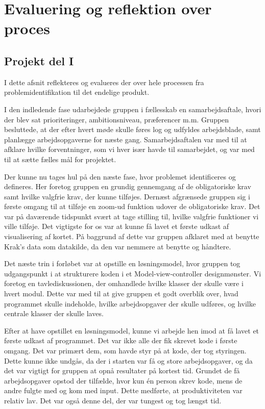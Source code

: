 \section{Evaluering og reflektion over proces}
\label{sec:evaluering_og_reflektion_over_proces}

\subsection{Projekt del I}

I dette afsnit reflekteres og evalueres der over hele processen fra problemidentifikation til det endelige produkt. 

I den indledende fase udarbejdede gruppen i fællesskab en samarbejdsaftale, hvori der blev sat prioriteringer, ambitionsniveau, præferencer m.m. Gruppen besluttede, at der efter hvert møde skulle føres log og udfyldes arbejdsblade, samt planlægge arbejdsopgaverne for næste gang. Samarbejdsaftalen var med til at afklare hvilke forventninger, som vi hver især havde til samarbejdet, og var med til at sætte fælles mål for projektet.

Der kunne nu tages hul på den næste fase, hvor problemet identificeres og defineres. Her foretog gruppen en grundig gennemgang af de obligatoriske krav samt hvilke valgfrie krav, der kunne tilføjes. Dernæst afgrænsede gruppen sig i første omgang til at tilføje en zoom-ud funktion udover de obligatoriske krav. Det var på daværende tidspunkt svært at tage stilling til, hvilke valgfrie funktioner vi ville tilføje. Det vigtigste for os var at kunne få lavet et første udkast af visualisering af kortet. På baggrund af dette var gruppen afklaret med at benytte Krak's data som datakilde, da den var nemmere at benytte og håndtere.   

Det næste trin i forløbet var at opstille en løsningsmodel, hvor gruppen tog udgangspunkt i at strukturere koden i et Model-view-controller designmønster. Vi foretog en tavlediskussionen, der omhandlede hvilke klasser der skulle være i hvert modul. Dette var med til at give gruppen et godt overblik over, hvad programmet skulle indeholde, hvilke arbejdsopgaver der skulle udføres, og hvilke centrale klasser der skulle laves. 

Efter at have opstillet en løsningsmodel, kunne vi arbejde hen imod at få lavet et første udkast af programmet. Det var ikke alle der fik skrevet kode i første omgang. Det var primært dem, som havde styr på at kode, der tog styringen. Dette kunne ikke undgås, da der i starten var få og store arbejdsopgaver, og da det var vigtigt for gruppen at opnå resultater på kortest tid. Grundet de få arbejdsopgaver opstod der tilfælde, hvor kun én person skrev kode, mens de andre fulgte med og kom med input. Dette medførte, at produktiviteten var relativ lav. Det var også denne del, der var tungest og tog længst tid. 

